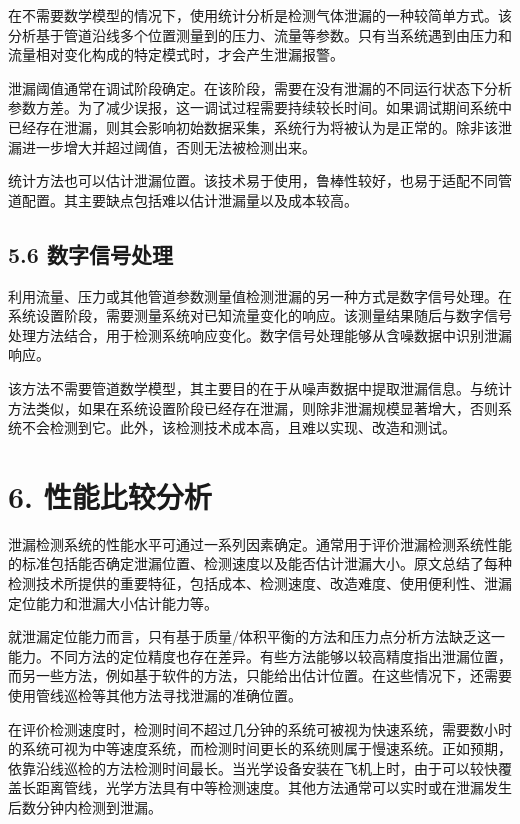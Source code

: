 在不需要数学模型的情况下，使用统计分析是检测气体泄漏的一种较简单方式。该分析基于管道沿线多个位置测量到的压力、流量等参数。只有当系统遇到由压力和流量相对变化构成的特定模式时，才会产生泄漏报警。

泄漏阈值通常在调试阶段确定。在该阶段，需要在没有泄漏的不同运行状态下分析参数方差。为了减少误报，这一调试过程需要持续较长时间。如果调试期间系统中已经存在泄漏，则其会影响初始数据采集，系统行为将被认为是正常的。除非该泄漏进一步增大并超过阈值，否则无法被检测出来。

统计方法也可以估计泄漏位置。该技术易于使用，鲁棒性较好，也易于适配不同管道配置。其主要缺点包括难以估计泄漏量以及成本较高。

\subsection*{5.6 数字信号处理}

利用流量、压力或其他管道参数测量值检测泄漏的另一种方式是数字信号处理。在系统设置阶段，需要测量系统对已知流量变化的响应。该测量结果随后与数字信号处理方法结合，用于检测系统响应变化。数字信号处理能够从含噪数据中识别泄漏响应。

该方法不需要管道数学模型，其主要目的在于从噪声数据中提取泄漏信息。与统计方法类似，如果在系统设置阶段已经存在泄漏，则除非泄漏规模显著增大，否则系统不会检测到它。此外，该检测技术成本高，且难以实现、改造和测试。

\section*{6. 性能比较分析}

泄漏检测系统的性能水平可通过一系列因素确定。通常用于评价泄漏检测系统性能的标准包括能否确定泄漏位置、检测速度以及能否估计泄漏大小。原文总结了每种检测技术所提供的重要特征，包括成本、检测速度、改造难度、使用便利性、泄漏定位能力和泄漏大小估计能力等。

就泄漏定位能力而言，只有基于质量/体积平衡的方法和压力点分析方法缺乏这一能力。不同方法的定位精度也存在差异。有些方法能够以较高精度指出泄漏位置，而另一些方法，例如基于软件的方法，只能给出估计位置。在这些情况下，还需要使用管线巡检等其他方法寻找泄漏的准确位置。

在评价检测速度时，检测时间不超过几分钟的系统可被视为快速系统，需要数小时的系统可视为中等速度系统，而检测时间更长的系统则属于慢速系统。正如预期，依靠沿线巡检的方法检测时间最长。当光学设备安装在飞机上时，由于可以较快覆盖长距离管线，光学方法具有中等检测速度。其他方法通常可以实时或在泄漏发生后数分钟内检测到泄漏。

